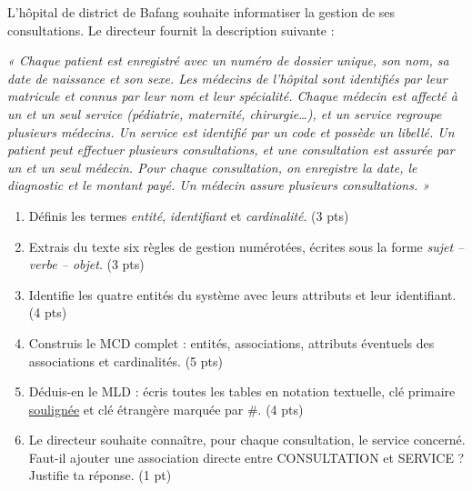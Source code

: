 \documentclass[11pt]{article}
\newcounter{popsec}
\newcounter{popsub}
\newcommand{\courssub}[1]{%
  \stepcounter{popsub}%
  \par\vspace{9pt}\noindent{\popxbold\fontsize{11.5}{13}\selectfont\color{popink}{\color{poporange}\thepopsec.\thepopsub}\hspace{6pt}#1}\par\nopagebreak\vspace{4pt}
}
\begin{document}
\courssub{Je me prépare au Bac}

\begin{exercice}
L'hôpital de district de Bafang souhaite informatiser la gestion de ses consultations. Le directeur fournit la description suivante :

\emph{« Chaque patient est enregistré avec un numéro de dossier unique, son nom, sa date de naissance et son sexe. Les médecins de l'hôpital sont identifiés par leur matricule et connus par leur nom et leur spécialité. Chaque médecin est affecté à un et un seul service (pédiatrie, maternité, chirurgie\ldots), et un service regroupe plusieurs médecins. Un service est identifié par un code et possède un libellé. Un patient peut effectuer plusieurs consultations, et une consultation est assurée par un et un seul médecin. Pour chaque consultation, on enregistre la date, le diagnostic et le montant payé. Un médecin assure plusieurs consultations. »}

\begin{enumerate}
  \item Définis les termes \emph{entité}, \emph{identifiant} et \emph{cardinalité}. \hfill (3 pts)
  \item Extrais du texte six règles de gestion numérotées, écrites sous la forme \emph{sujet -- verbe -- objet}. \hfill (3 pts)
  \item Identifie les quatre entités du système avec leurs attributs et leur identifiant. \hfill (4 pts)
  \item Construis le MCD complet : entités, associations, attributs éventuels des associations et cardinalités. \hfill (5 pts)
  \item Déduis-en le MLD : écris toutes les tables en notation textuelle, clé primaire \underline{soulignée} et clé étrangère marquée par \#. \hfill (4 pts)
  \item Le directeur souhaite connaître, pour chaque consultation, le service concerné. Faut-il ajouter une association directe entre CONSULTATION et SERVICE ? Justifie ta réponse. \hfill (1 pt)
\end{enumerate}
\end{exercice}
\end{document}
